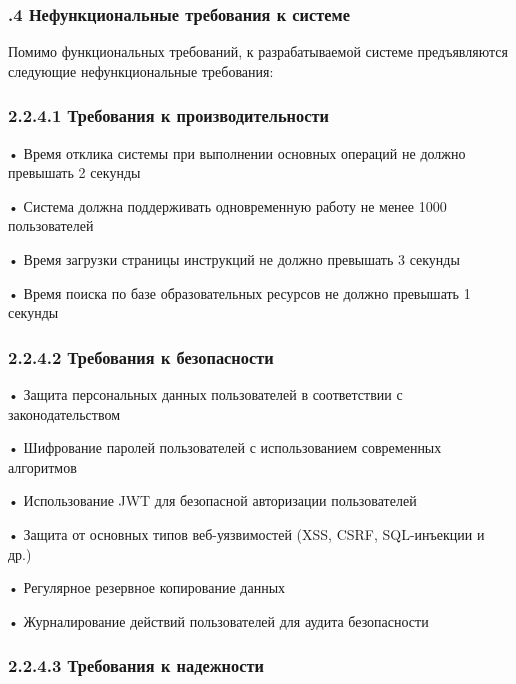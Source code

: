 \subtitlespace

\subsubsection*{ 
  \gostTitleFont
  .4 Нефункциональные требования к системе
} 

\subtitlespace

{\gostFont

  \par \redline Помимо функциональных требований, к разрабатываемой системе предъявляются следующие нефункциональные требования:

  \subsubsection*{2.2.4.1 Требования к производительности}

  \par \redline • Время отклика системы при выполнении основных операций не должно превышать 2 секунды
  \par \redline • Система должна поддерживать одновременную работу не менее 1000 пользователей
  \par \redline • Время загрузки страницы инструкций не должно превышать 3 секунды
  \par \redline • Время поиска по базе образовательных ресурсов не должно превышать 1 секунды

  \subsubsection*{2.2.4.2 Требования к безопасности}

  \par \redline • Защита персональных данных пользователей в соответствии с законодательством
  \par \redline • Шифрование паролей пользователей с использованием современных алгоритмов
  \par \redline • Использование JWT для безопасной авторизации пользователей
  \par \redline • Защита от основных типов веб-уязвимостей (XSS, CSRF, SQL-инъекции и др.)
  \par \redline • Регулярное резервное копирование данных
  \par \redline • Журналирование действий пользователей для аудита безопасности

  \subsubsection*{2.2.4.3 Требования к надежности}

}
